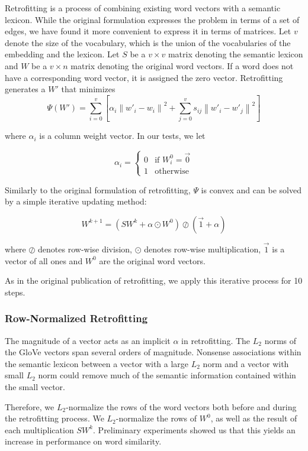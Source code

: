\documentclass[letterpaper]{article}
\begin{document}
Retrofitting \cite{faruqui2014retrofitting} is a process of combining existing
word vectors with a semantic lexicon. While the original formulation expresses
the problem in terms of a set of edges, we have found it more convenient to
express it in terms of matrices. Let $v$ denote the size of the vocabulary,
which is the union of the vocabularies of the embedding and the lexicon. Let $S$ be
a $v \times v$ matrix denoting the semantic lexicon and $W$ be a $v \times n$
matrix denoting the original word vectors. If a word does not have a
corresponding word vector, it is assigned the zero vector. Retrofitting
generates a $W'$ that minimizes
$$
\Psi \left( W' \right) = \sum_{i=0}^v \left[
  \alpha_i \left\|  w'_i - w_i \right\| ^ 2
  + \sum_{j=0}^v s_{ij} \left\| w'_i - w'_j \right\| ^ 2
\right]
$$

where $\alpha_i$ is a column weight vector. In our tests, we let

$$
\alpha_i =
  \begin{cases}
    0 & \text{if $W^0_i = \vec{0}$} \\
    1 & \text{otherwise}
  \end{cases}
$$

Similarly to the original formulation of retrofitting, $\Psi$ is convex and can
be solved by a simple iterative updating method:

$$
W^{k+1} = \left( S W^k + \alpha \odot W^0 \right)
\oslash \left( \vec{1} + \alpha \right)
$$

where $\oslash$ denotes row-wise division, $\odot$ denotes row-wise
multiplication, $\vec{1}$ is a vector of all ones and $W^0$ are the original
word vectors.

As in the original publication of retrofitting, we apply this iterative process
for 10 steps.

\subsubsection{Row-Normalized Retrofitting}

The magnitude of a vector acts as an implicit $\alpha$ in retrofitting.
The $L_2$ norms of the GloVe vectors span several orders of magnitude.
Nonsense associations within the semantic lexicon between a vector with a large
$L_2$ norm and a vector with small $L_2$ norm could remove much of the semantic
information contained within the small vector.

Therefore, we $L_2$-normalize
the rows of the word vectors both before and during the retrofitting process.
We $L_2$-normalize the rows of $W^0$, as well as the result of each
multiplication $S W^k$. Preliminary experiments showed us that this yields
an increase in performance on word similarity.
\end{document}
